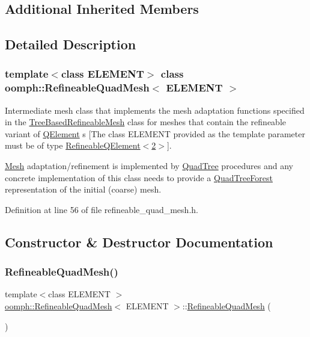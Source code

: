 \subsection*{Additional Inherited Members}


\subsection{Detailed Description}
\subsubsection*{template$<$class E\+L\+E\+M\+E\+NT$>$\newline
class oomph\+::\+Refineable\+Quad\+Mesh$<$ E\+L\+E\+M\+E\+N\+T $>$}

Intermediate mesh class that implements the mesh adaptation functions specified in the \hyperlink{classoomph_1_1TreeBasedRefineableMesh}{Tree\+Based\+Refineable\+Mesh} class for meshes that contain the refineable variant of \hyperlink{classoomph_1_1QElement}{Q\+Element} s \mbox{[}The class E\+L\+E\+M\+E\+NT provided as the template parameter must be of type \hyperlink{classoomph_1_1RefineableQElement_3_012_01_4}{Refineable\+Q\+Element$<$2$>$}\mbox{]}.

\hyperlink{classoomph_1_1Mesh}{Mesh} adaptation/refinement is implemented by \hyperlink{classoomph_1_1QuadTree}{Quad\+Tree} procedures and any concrete implementation of this class needs to provide a \hyperlink{classoomph_1_1QuadTreeForest}{Quad\+Tree\+Forest} representation of the initial (coarse) mesh. 

Definition at line 56 of file refineable\+\_\+quad\+\_\+mesh.\+h.



\subsection{Constructor \& Destructor Documentation}
\mbox{\label{classoomph_1_1RefineableQuadMesh_aac672fe61fe31636cadc243b82c05c9e}} 
\subsubsection{\texorpdfstring{Refineable\+Quad\+Mesh()}{RefineableQuadMesh()}\hspace{0.1cm}{\footnotesize\ttfamily [1/2]}}
{\footnotesize\ttfamily template$<$class E\+L\+E\+M\+E\+NT $>$ \\
\hyperlink{classoomph_1_1RefineableQuadMesh}{oomph\+::\+Refineable\+Quad\+Mesh}$<$ E\+L\+E\+M\+E\+NT $>$\+::\hyperlink{classoomph_1_1RefineableQuadMesh}{Refineable\+Quad\+Mesh} (\begin{DoxyParamCaption}{ }\end{DoxyParamCaption})\hspace{0.3cm}{\ttfamily [inline]}}



